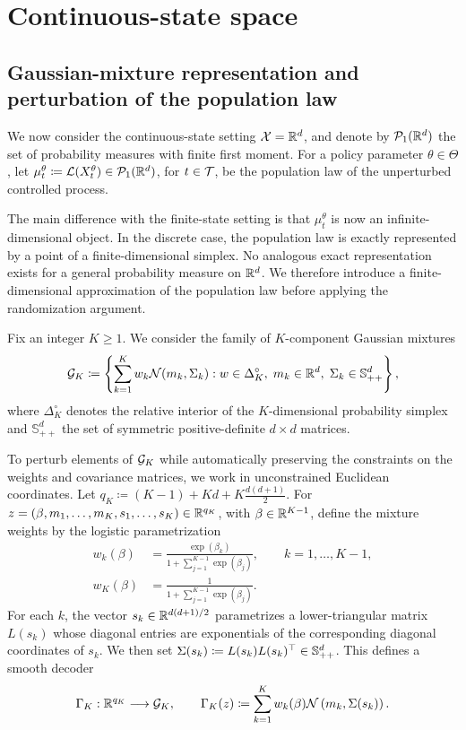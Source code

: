 \section{Continuous-state space}
\label{sec:continuous-state-space}

\subsection{Gaussian-mixture representation and perturbation of the population law}
\label{subsec:continuous-gmm-perturbation}

We now consider the continuous-state setting $\Xc=\R^d$, and denote by $\Pc_1(\R^d)$ the set of probability measures with finite first moment. For a policy parameter $\theta\in\Theta$, let $\mu_t^\theta\coloneqq \Lc(X_t^\theta)\in\Pc_1(\R^d)$, for $t\in\Tc$, be the population law of the unperturbed controlled process.

The main difference with the finite-state setting is that $\mu_t^\theta$ is now an infinite-dimensional object. In the discrete case, the population law is exactly represented by a point of a finite-dimensional simplex. No analogous exact representation exists for a general probability measure on $\R^d$. We therefore introduce a finite-dimensional approximation of the population law before applying the randomization argument.

Fix an integer $K\geq1$. We consider the family of $K$-component Gaussian mixtures
\begin{align}
    \Gc_K\coloneqq \left\{\sum_{k=1}^{K} w_k\Nc(m_k,\Sigma_k) : w\in\Delta_K^\circ,\;m_k\in\R^d,\;\Sigma_k\in\S_{++}^d \right\},
\end{align}
where $\Delta_K^\circ$ denotes the relative interior of the $K$-dimensional probability simplex and $\mathbb S_{++}^d$ the set of symmetric positive-definite $d\times d$ matrices.

To perturb elements of $\Gc_K$ while automatically preserving the constraints on the weights and covariance matrices, we work in unconstrained Euclidean coordinates. Let $q_K\coloneqq (K-1) + Kd + K\frac{d(d+1)}{2}$. For $z=\left(\beta,m_1,\ldots,m_K,s_1,\ldots,s_K \right)\in\R^{q_K}$, with $\beta\in\R^{K-1}$, define the mixture weights by the logistic parametrization
\begin{align}
    w_k(\beta) &= \frac{\exp(\beta_k)}{1 + \sum_{j=1}^{K-1}\exp(\beta_j)},\qquad k=1,\ldots,K-1,\\
    w_K(\beta) &= \frac{1}{1+\sum_{j=1}^{K-1} \exp(\beta_j)}.
\end{align}
For each $k$, the vector $s_k\in\R^{d(d+1)/2}$ parametrizes a lower-triangular matrix $L(s_k)$ whose diagonal entries are exponentials of the corresponding diagonal coordinates of $s_k$. We then set $\Sigma(s_k)\coloneqq L(s_k)L(s_k)^\top\in\S_{++}^d$. This defines a smooth decoder
\begin{align}
    \label{eq:gmm-decoder}
    \Gamma_K:\R^{q_K}\longrightarrow\Gc_K,\qquad \Gamma_K(z)\coloneqq\sum_{k=1}^{K} w_k(\beta)\Nc\left(m_k,\Sigma(s_k)\right).
\end{align}

